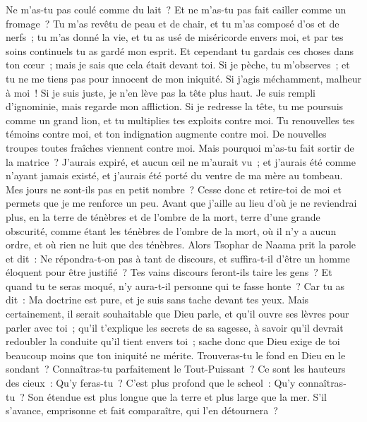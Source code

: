 \begin{multicols}{2}
Ne m'as-tu pas coulé comme du lait~? Et ne m'as-tu pas fait cailler comme un fromage~?
Tu m'as revêtu de peau et de chair, et tu m'as composé d'os et de nerfs~;
tu m'as donné la vie, et tu as usé de miséricorde envers moi, et par tes soins continuels tu as gardé mon esprit.
Et cependant tu gardais ces choses dans ton cœur~; mais je sais que cela était devant toi.
Si je pèche, tu m'observes~; et tu ne me tiens pas pour innocent de mon iniquité.
Si j'agis méchamment, malheur à moi~! Si je suis juste, je n'en lève pas la tête plus haut. Je suis rempli d'ignominie, mais regarde mon affliction.
Si je redresse la tête, tu me poursuis comme un grand lion, et tu multiplies tes exploits contre moi.
Tu renouvelles tes témoins contre moi, et ton indignation augmente contre moi. De nouvelles troupes toutes fraîches viennent contre moi.
Mais pourquoi m'as-tu fait sortir de la matrice~? J'aurais expiré, et aucun œil ne m'aurait vu~;
et j'aurais été comme n'ayant jamais existé, et j'aurais été porté du ventre de ma mère au tombeau.
Mes jours ne sont-ils pas en petit nombre~? Cesse donc et retire-toi de moi et permets que je me renforce un peu.
Avant que j'aille au lieu d'où je ne reviendrai plus, en la terre de ténèbres et de l'ombre de la mort,
terre d'une grande obscurité, comme étant les ténèbres de l'ombre de la mort, où il n'y a aucun ordre, et où rien ne luit que des ténèbres.
\VerseOne{}Alors Tsophar de Naama prit la parole et dit~:
Ne répondra-t-on pas à tant de discours, et suffira-t-il d'être un homme éloquent pour être justifié~?
Tes vains discours feront-ils taire les gens~? Et quand tu te seras moqué, n'y aura-t-il personne qui te fasse honte~?
Car tu as dit~: Ma doctrine est pure, et je suis sans tache devant tes yeux.
Mais certainement, il serait souhaitable que Dieu parle, et qu'il ouvre ses lèvres pour parler avec toi~;
qu'il t'explique les secrets de sa sagesse, à savoir qu'il devrait redoubler la conduite qu'il tient envers toi~; sache donc que Dieu exige de toi beaucoup moins que ton iniquité ne mérite.
Trouveras-tu le fond en Dieu en le sondant~? Connaîtras-tu parfaitement le Tout-Puissant~?
Ce sont les hauteurs des cieux~: Qu'y feras-tu~? C'est plus profond que le scheol~: Qu'y connaîtras-tu~?
Son étendue est plus longue que la terre et plus large que la mer.
S'il s'avance, emprisonne et fait comparaître, qui l'en détournera~?

\end{multicols}
